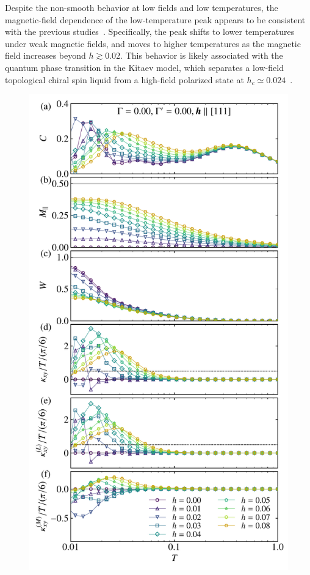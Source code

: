 \documentclass[twocolumn,superscriptaddress,showpacs, longbibliography, aps, prx]{revtex4-2}
\begin{document}
Despite the non-smooth behavior at low fields and low temperatures, the magnetic-field dependence of the low-temperature peak appears to be consistent with the previous studies~\cite{YoshitakeNKM2020,Li2020,LiZWWGQLGL2021,LiLXGQLS2024}. 
Specifically, the peak shifts to lower temperatures under weak magnetic fields, and moves to higher temperatures as the magnetic field increases beyond $h \gtrsim 0.02$.
This behavior is likely associated with the quantum phase transition in the Kitaev model, which separates a low-field topological chiral spin liquid from a high-field polarized state at $h_c \simeq 0.024$~\cite{Gohlke2018}. 

\begin{figure}[tbh]
  \begin{center}
    \includegraphics[width=\linewidth]{Data_for_figs/plot/fig-05-XTRG-hdep.pdf}

\end{center}
\end{figure}
\end{document}
